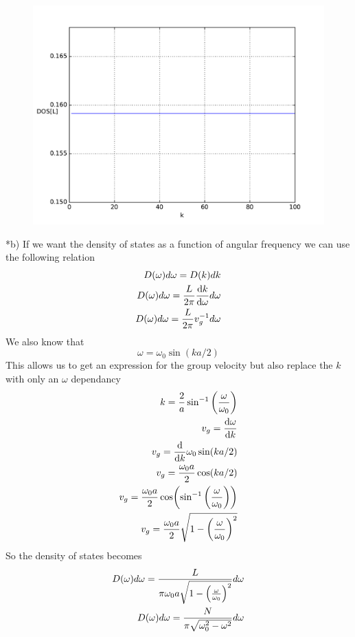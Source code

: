 \documentclass[a4paper]{article}
\begin{document}
\begin{section}
\begin{subsection}
		\begin{figure}[H]
			\includegraphics[width = 0.8\linewidth]{2a.pdf}
			\center
		\end{figure}
	\end{subsection}
	\begin{subsection}*{b)}
		If we want the density of states as a function of angular frequency we can use the following relation
		\begin{align*}
			D(\omega)d\omega = D(k)dk\\
			D(\omega)d\omega = \frac{L}{2\pi}\dv{k}{\omega}d\omega\\
			D(\omega)d\omega = \frac{L}{2\pi}v_g^{-1}d\omega\\
		\end{align*}
		We also know that
		$$\omega = \omega_0\sin(ka/2)$$
		This allows us to get an expression for the group velocity but also replace the $k$ with only an $\omega$ dependancy
		\begin{align*}
			k = \frac{2}{a}\sin^{-1}\qty(\frac{\omega}{\omega_0})\\
			v_g = \dv{\omega}{k} \\
			v_g= \dv{k}\omega_0\sin(ka/2)\\
			v_g=\frac{\omega_0a}{2}\cos(ka/2)\\
			v_g=\frac{\omega_0a}{2}\cos(\sin^{-1}\qty(\frac{\omega}{\omega_0}))\\
			v_g = \frac{\omega_0a}{2}\sqrt{1-\qty(\frac{\omega}{\omega_0})^2}
		\end{align*}
		So the density of states becomes
		\begin{align*}
			D(\omega)d\omega = \frac{L}{ \pi\omega_0a\sqrt{1-\qty(\frac{\omega}{\omega_0})^2} } d\omega\\
			D(\omega)d\omega = \frac{N}{ \pi\sqrt{\omega_0^2-\omega^2} } d\omega

\end{align*}
\end{subsection}
\end{section}
\end{document}
